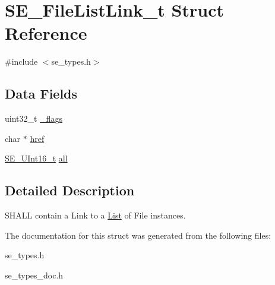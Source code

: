 \hypertarget{structSE__FileListLink__t}{}\section{S\+E\+\_\+\+File\+List\+Link\+\_\+t Struct Reference}
\label{structSE__FileListLink__t}


{\ttfamily \#include $<$se\+\_\+types.\+h$>$}

\subsection*{Data Fields}
\begin{DoxyCompactItemize}
\item 
uint32\+\_\+t \hyperlink{group__FileListLink_gaced91cb9594ebae572e6a7216179d24d}{\+\_\+flags}
\item 
char $\ast$ \hyperlink{group__FileListLink_ga031e60ab342d2ccd4ac921fd30ffb9b1}{href}
\item 
\hyperlink{group__UInt16_gac68d541f189538bfd30cfaa712d20d29}{S\+E\+\_\+\+U\+Int16\+\_\+t} \hyperlink{group__FileListLink_ga29b8ccd48909ecad5f8c9f14eacafe2c}{all}
\end{DoxyCompactItemize}


\subsection{Detailed Description}
S\+H\+A\+LL contain a Link to a \hyperlink{structList}{List} of File instances. 

The documentation for this struct was generated from the following files\+:\begin{DoxyCompactItemize}
\item 
se\+\_\+types.\+h\item 
se\+\_\+types\+\_\+doc.\+h\end{DoxyCompactItemize}
